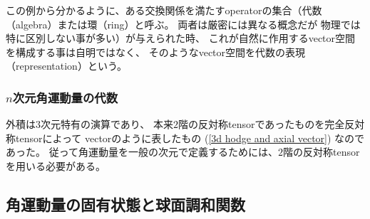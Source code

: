 この例から分かるように、ある交換関係を満たすoperatorの集合（代数（algebra）または環（ring）と呼ぶ。
両者は厳密には異なる概念だが
物理では特に区別しない事が多い）が与えられた時、
これが自然に作用するvector空間を構成する事は自明ではなく、
そのようなvector空間を代数の表現（representation）という。

\subsubsection{$n$次元角運動量の代数}

外積は$3$次元特有の演算であり、
本来$2$階の反対称tensorであったものを完全反対称tensorによって
vectorのように表したもの
(\ref{3d hodge and axial vector})
なのであった。
従って角運動量を一般の次元で定義するためには、$2$階の反対称tensorを用いる必要がある。

\subsection{角運動量の固有状態と球面調和関数}

